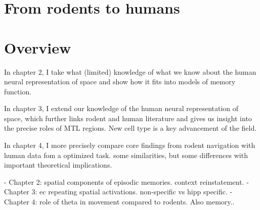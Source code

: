 \section{From rodents to humans}
\section{Overview}

In chapter 2, I take what (limited) knowledge of what we know about the human neural representation of space and show how it fits into models of memory function.

In chapter 3, I extend our knowledge of the human neural representation of space, which further links rodent and human literature and gives us insight into the precise roles of MTL regions. New cell type is a key advancement of the field.

In chapter 4, I more precisely compare core findings from rodent navigation with human data fom a optimized task. some similarities, but some differences with important theoretical implications.

- Chapter 2: spatial components of episodic memories. context reinstatement.
- Chapter 3: ec repeating spatial activations. non-specific vs hipp specific.
- Chapter 4: role of theta in movement compared to rodents. Also memory..

